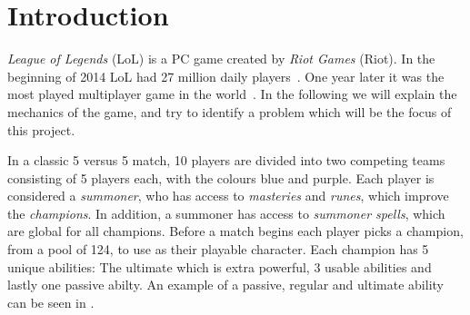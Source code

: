 \section{Introduction}\label{sec:intro}



\emph{League of Legends} (LoL) is a PC game created by \emph{Riot Games} (Riot). In the beginning of 2014 LoL had 27 million daily players~\cite{LoL27mill}. One year later it was the most played multiplayer game in the world~\cite{LoLmostplayed}. 
In the following we will explain the mechanics of the game, and try to identify a problem which will be the focus of this project. 

In a classic 5 versus 5 match, 10 players are divided into two competing teams consisting of 5 players each, with the colours blue and purple. Each player is considered a \emph{summoner}, who has access to \emph{masteries} and \emph{runes}, which improve the \emph{champions}. In addition, a summoner has access to \emph{summoner spells}, which are global for all champions. Before a match begins each player picks a champion, from a pool of 124, to use as their playable character. Each champion has 5 unique abilities: The ultimate which is extra powerful, 3 usable abilities and lastly one passive abilty. An example of a passive, regular and ultimate ability can be seen in .

